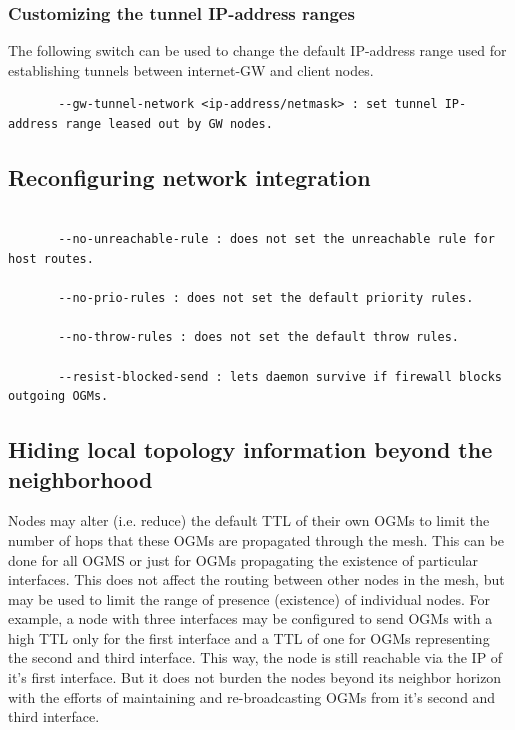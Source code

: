 \documentclass[11pt]{article}
\begin{document}
\subsubsection{Customizing the tunnel IP-address ranges}

The following switch can be used to change the default IP-address range used for establishing tunnels between internet-GW and client nodes.

\begin{small} \begin{verbatim}
       --gw-tunnel-network <ip-address/netmask> : set tunnel IP-address range leased out by GW nodes.
\end{verbatim} \end{small}




\subsection{Reconfiguring network integration}

\begin{small} \begin{verbatim}

       --no-unreachable-rule : does not set the unreachable rule for host routes.

       --no-prio-rules : does not set the default priority rules.

       --no-throw-rules : does not set the default throw rules.

       --resist-blocked-send : lets daemon survive if firewall blocks outgoing OGMs.

\end{verbatim} \end{small}

\subsection{Hiding local topology information beyond the neighborhood}
\label{sec:hiding-topology}
Nodes may alter (i.e. reduce) the default TTL of their own OGMs to limit the number of hops that these OGMs are propagated through the mesh.
This can be done for all OGMS or just for OGMs propagating the existence of particular interfaces.
This does not affect the routing between other nodes in the mesh, but may be used to limit the range of presence (existence) of individual nodes.
For example, a node with three interfaces may be configured to send OGMs with a high TTL only for the first interface and a TTL of one for OGMs representing the second and third interface.
%
This way, the node is still reachable via the IP of it's first interface.
But it does not burden the nodes beyond its neighbor horizon with the efforts of maintaining and re-broadcasting OGMs from it's second and third interface.
\end{document}

